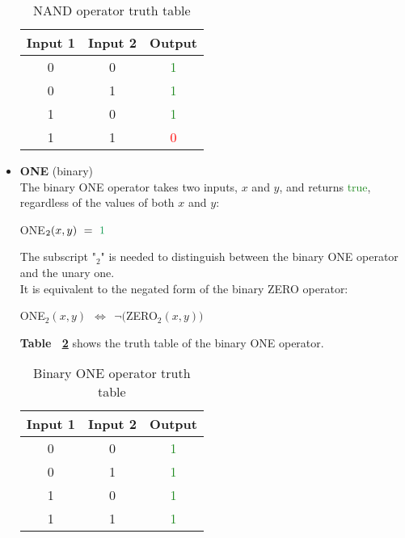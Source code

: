 \documentclass[]{usiinfbachelorproject}
\begin{document}
\begin{itemize}
        \begin{table}[H]
            \centering
            \begin{tabular}{|c|c|c|}
                \hline
                \textbf{Input 1} & \textbf{Input 2} & \textbf{Output} \\
                \hline
                0 & 0 & \textcolor{ForestGreen}{1} \\
                \hline
                0 & 1 & \textcolor{ForestGreen}{1} \\
                \hline
                1 & 0 & \textcolor{ForestGreen}{1} \\
                \hline
                1 & 1 & \textcolor{red}{0} \\
                \hline
            \end{tabular}
            \caption{NAND operator truth table}
            \label{tab:nand-table}
        \end{table}
    \item \textbf{ONE} (binary)
        \vspace{0.2cm} \\
        The binary ONE operator takes two inputs, $x$ and $y$, and returns \textcolor{ForestGreen}{true}, regardless of the values of both $x$ and $y$:
        \begin{center}
            \begin{center}
                ONE$_2(x,y) \ =\ \textcolor{ForestGreen}{1}$
            \end{center}
        \end{center}
        The subscript "$_2$" is needed to distinguish between the binary ONE operator and the unary one. \\
        It is equivalent to the negated form of the binary ZERO operator:
        \begin{center}
            ONE$_2(x,y) \ \ \Longleftrightarrow \ \ \neg($ZERO$_2(x,y))$
        \end{center}
        \textbf{Table ~\ref{tab:one-table}} shows the truth table of the binary ONE operator.
        \begin{table}[H]
            \centering
            \begin{tabular}{|c|c|c|}
                \hline
                \textbf{Input 1} & \textbf{Input 2} & \textbf{Output} \\
                \hline
                0 & 0 & \textcolor{ForestGreen}{1} \\
                \hline
                0 & 1 & \textcolor{ForestGreen}{1} \\
                \hline
                1 & 0 & \textcolor{ForestGreen}{1} \\
                \hline
                1 & 1 & \textcolor{ForestGreen}{1} \\
                \hline
            \end{tabular}
            \caption{Binary ONE operator truth table}
            \label{tab:one-table}
        \end{table}
\end{itemize}

\newpage



\end{document}
